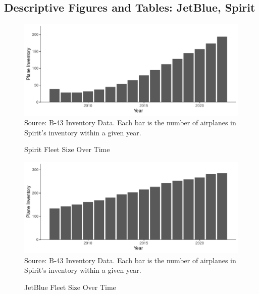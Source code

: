 \documentclass{article}
\begin{document}
\begin{appendices}
\FloatBarrier
	
	\subsection{Descriptive Figures and Tables: JetBlue, Spirit}
	\begin{figure}
	\caption{Spirit Fleet Size Over Time}
	\label{fig:Spirit_fleet}
	\includegraphics[width = \linewidth]{Spirit_Planes.pdf}
	\footnotesize{Source: B-43 Inventory Data. Each bar is the number of airplanes in Spirit's inventory within a given year.}
\end{figure}

\begin{figure}
	\caption{JetBlue Fleet Size Over Time}
	\label{fig:JetBlue_Fleet}
	\includegraphics[width = \linewidth]{JetBlue_Planes.pdf}
	\footnotesize{Source: B-43 Inventory Data. Each bar is the number of airplanes in Spirit's inventory within a given year.}
\end{figure}


\end{appendices}
\end{document}
